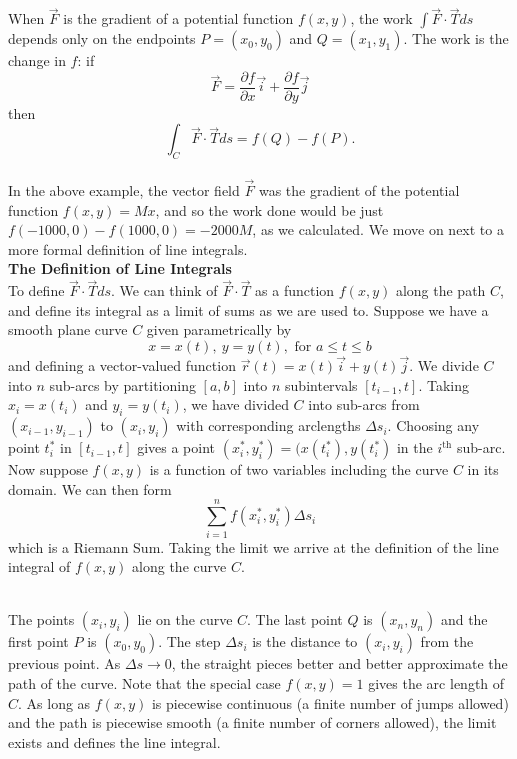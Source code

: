 {
When $\vec F$ is the gradient of a potential function $f(x, y)$, the work $\int \vec F \cdot \vec T ds$ depends only on the endpoints $P = (x_0,y_0)$ and $Q = (x_1,y_1)$. The work is the change in $f$: if
$$\vec F = \frac{\partial f}{\partial x} \vec i + \frac{\partial f}{\partial y} \vec j$$
then
$$\int_C \vec F \cdot \vec T ds = f(Q) - f(P).$$
}\\

In the above example, the vector field $\vec F$ was the gradient of the potential function $f(x,y) = Mx$, and so the work done would be just $f(-1000,0) - f(1000,0) = -2000M$, as we calculated.  We move on next to a more formal definition of line integrals. \\




\noindent\textbf{\large The Definition of Line Integrals}\\

To define $\vec F \cdot \vec T ds$. We can think of $\vec F \cdot \vec T$ as a function $f(x, y)$
along the path $C$, and define its integral as a limit of sums as we are used to. Suppose we have a smooth plane curve $C$ given parametrically by
$$x = x(t), \: y = y(t), \text{ for } a \leq t \leq b$$
and defining a vector-valued function $\vec r (t) = x(t) \vec i + y(t) \vec j$.  We divide $C$ into $n$ sub-arcs by partitioning $[a,b]$ into $n$ subintervals $[t_{i-1},t]$. Taking $x_i = x(t_i)$ and $y_i = y(t_i)$, we have divided $C$ into sub-arcs from $(x_{i-1},y_{i-1})$ to $(x_i,y_i)$ with corresponding arclengths $\Delta s_i$.  Choosing any point $t_i^{\ast}$ in $[t_{i-1},t]$ gives a point $(x_i^{\ast},y_i^{\ast}) = (x(t_i^{\ast}), y(t_i^{\ast})$ in the $i^{\text{th}}$ sub-arc.\\

Now suppose $f(x,y)$ is a function of two variables including the curve $C$ in its domain.  We can then form
$$\sum_{i=1}^{n} f(x_i^{\ast},y_i^{\ast}) \Delta s_i$$
which is a Riemann Sum.  Taking the limit we arrive at the definition of the line integral of $f(x,y)$ along the curve $C$.


\\


The points $(x_i, y_i)$ lie on the curve $C$. The last point $Q$ is $(x_n, y_n)$ and the first point $P$ is $(x_0, y_0)$. The step $\Delta s_i$ is the distance to $(x_i, y_i)$ from the previous point. As $\Delta s \to 0$, the straight pieces better and better approximate the path of the curve. Note that the special case $f(x,y) = 1$ gives the arc length of $C$. As long as $f(x, y)$ is piecewise continuous (a finite number of jumps allowed) and the path is piecewise smooth (a finite number of corners allowed), the limit exists and defines the line integral.\\

